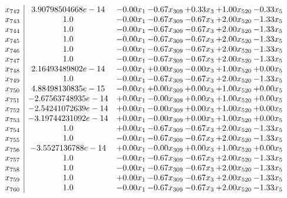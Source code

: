 \documentclass[8pt]{article}
\begin{document}
\[\begin{array}{c| c c@{\hskip 2pt} c@{\hskip 2pt} c@{\hskip 2pt} c@{\hskip 2pt} c@{\hskip 2pt} }
 x_{742}   &  3.90798504668e-14 & -0.00 x_{1} & -0.67 x_{309} & +  0.33 x_{3} & +  1.00 x_{520} & -0.33 x_{5}\\
 x_{743}   &  1.0 & -0.00 x_{1} & -0.67 x_{309} & -0.67 x_{3} & +  2.00 x_{520} & -1.33 x_{5}\\
 x_{744}   &  1.0 & -0.00 x_{1} & -0.67 x_{309} & -0.67 x_{3} & +  2.00 x_{520} & -1.33 x_{5}\\
 x_{745}   &  1.0 & -0.00 x_{1} & -0.67 x_{309} & -0.67 x_{3} & +  2.00 x_{520} & -1.33 x_{5}\\
 x_{746}   &  1.0 & -0.00 x_{1} & -0.67 x_{309} & -0.67 x_{3} & +  2.00 x_{520} & -1.33 x_{5}\\
 x_{747}   &  1.0 & -0.00 x_{1} & -0.67 x_{309} & -0.67 x_{3} & +  2.00 x_{520} & -1.33 x_{5}\\
 x_{748}   &  2.16493489802e-14 & -0.00 x_{1} & +  0.00 x_{309} & -0.00 x_{3} & +  1.00 x_{520} & +  0.00 x_{5}\\
 x_{749}   &  1.0 & -0.00 x_{1} & -0.67 x_{309} & -0.67 x_{3} & +  2.00 x_{520} & -1.33 x_{5}\\
 x_{750}   &  4.88498130835e-15 & -0.00 x_{1} & +  0.00 x_{309} & +  0.00 x_{3} & +  1.00 x_{520} & +  0.00 x_{5}\\
 x_{751}   &  -2.67563748935e-14 & +  0.00 x_{1} & -0.00 x_{309} & +  0.00 x_{3} & +  1.00 x_{520} & +  0.00 x_{5}\\
 x_{752}   &  -2.54241072639e-14 & +  0.00 x_{1} & -0.00 x_{309} & +  0.00 x_{3} & +  1.00 x_{520} & +  0.00 x_{5}\\
 x_{753}   &  -3.19744231092e-14 & +  0.00 x_{1} & -0.00 x_{309} & +  0.00 x_{3} & +  1.00 x_{520} & +  0.00 x_{5}\\
 x_{754}   &  1.0 & +  0.00 x_{1} & -0.67 x_{309} & -0.67 x_{3} & +  2.00 x_{520} & -1.33 x_{5}\\
 x_{755}   &  1.0 & -0.00 x_{1} & -0.67 x_{309} & -0.67 x_{3} & +  2.00 x_{520} & -1.33 x_{5}\\
 x_{756}   &  -3.5527136788e-14 & +  0.00 x_{1} & -0.00 x_{309} & +  0.00 x_{3} & +  1.00 x_{520} & +  0.00 x_{5}\\
 x_{757}   &  1.0 & -0.00 x_{1} & -0.67 x_{309} & -0.67 x_{3} & +  2.00 x_{520} & -1.33 x_{5}\\
 x_{758}   &  1.0 & -0.00 x_{1} & -0.67 x_{309} & -0.67 x_{3} & +  2.00 x_{520} & -1.33 x_{5}\\
 x_{759}   &  1.0 & +  0.00 x_{1} & -0.67 x_{309} & -0.67 x_{3} & +  2.00 x_{520} & -1.33 x_{5}\\
 x_{760}   &  1.0 & -0.00 x_{1} & -0.67 x_{309} & -0.67 x_{3} & +  2.00 x_{520} & -1.33 x_{5}\\

\end{array}\]
\end{document}
